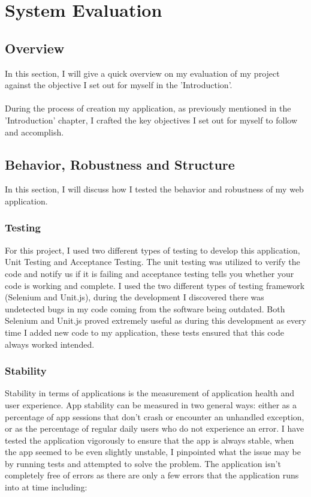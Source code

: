 \chapter{System Evaluation}

\section{Overview}

In this section, I will give a quick overview on my evaluation of my project against the objective I set out for myself in the 'Introduction'.\\ \\
During the process of creation my application, as previously mentioned in the 'Introduction' chapter, I crafted the key objectives I set out for myself to follow and accomplish.

\section{Behavior, Robustness and Structure}

In this section, I will discuss how I tested the behavior and robustness of my web application.

\subsection{Testing}

For this project, I used two different types of testing to develop this application, Unit Testing and Acceptance Testing. The unit testing was utilized to verify the code and notify us if it is failing and acceptance testing tells you whether your code is working and complete. I used the two different types of testing framework (Selenium and Unit.js), during the development I discovered there was undetected bugs in my code coming from the software being outdated. Both Selenium and Unit.js proved extremely useful as during this development as every time I added new code to my application, these tests ensured that this code always worked intended.

\subsection{Stability}

Stability in terms of applications is the measurement of application health and user experience. App stability can be measured in two general ways: either as a percentage of app sessions that don't crash or encounter an unhandled exception, or as the percentage of regular daily users who do not experience an error. I have tested the application vigorously to ensure that the app is always stable, when the app seemed to be even slightly unstable, I pinpointed what the issue may be by running tests and attempted to solve the problem. The application isn't completely free of errors as there are only a few errors that the application runs into at time including:

